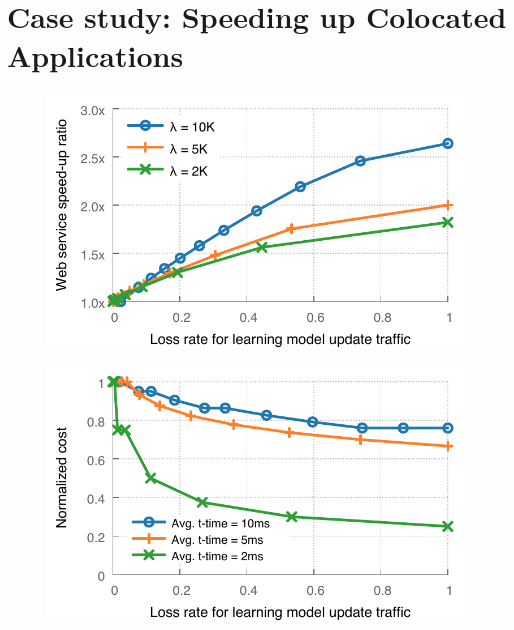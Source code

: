 \documentclass{article}
\begin{document}
\section{Case study: Speeding up Colocated Applications}

\begin{figure}[h]
\centering
\begin{minipage}{.3\textwidth}
  \centering
  \includegraphics[width=1.0\linewidth]{ml_drop_rate_to_speed_up}%
  \label{fig:drop-rate-to-speed-up}
\end{minipage}%
\hspace{0.05\textwidth}%
\begin{minipage}{.3\textwidth}
  \centering
  \includegraphics[width=1.0\linewidth]{ml_drop_rate_to_normalized_cost}%
  \label{fig:drop-rate-to-normalized-cost}
\end{minipage}%
\end{figure}
\end{document}
